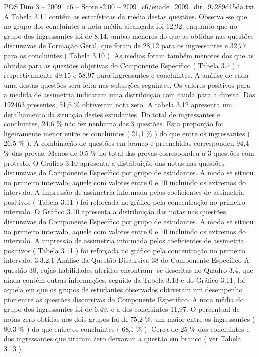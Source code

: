 \begin{textsample}{POS Dim 3 – 2009\_c6 – Score -2.00 – 2009\_c6/enade\_2009\_dir\_97289d15da.txt}
A Tabela 3.11 contém as estatísticas da média destas questões.
Observa -se que no grupo dos concluintes a nota média alcançada foi 12,92, enquanto que no grupo dos ingressantes foi de 8,14, ambas menores do que as obtidas nas questões discursivas de Formação Geral, que foram de 28,12 para os ingressantes e 32,77 para os concluintes ( Tabela 3.10 ).
As médias foram também menores dos que as obtidas para as questões objetivas do Componente Específico ( Tabela 3.7 ) : respectivamente 49,15 e 58,97 para ingressantes e concluintes.
A análise de cada uma destas questões será feita nas subseções seguintes.
Os valores positivos para a medida de assimetria indicaram uma distribuição com cauda para a direita.
Dos 192463 presentes, 51,6 \% obtiveram nota zero.
A tabela 3.12 apresenta um detalhamento da situação destes estudantes.
Do total de ingressantes e concluintes, 24,6 \% não fez nenhuma das 3 questões.
Esta proporção foi ligeiramente menor entre os concluintes ( 21,1 \% ) do que entre os ingressantes ( 26,5 \% ).
A combinação de questões em branco e preenchidas correspondeu 94,4 \% das provas.
Menos de 0,5 \% no total das provas correspondeu a 3 questões com protesto.
O Gráfico 3.10 apresenta a distribuição das notas nas questões discursivas do Componente Específico por grupo de estudantes.
A moda se situou no primeiro intervalo, aquele com valores entre 0 e 10 incluindo os extremos do intervalo.
A impressão de assimetria informada pelos coeficientes de assimetria positivos ( Tabela 3.11 ) foi reforçada no gráfico pela concentração no primeiro intervalo.
O Gráfico 3.10 apresenta a distribuição das notas nas questões discursivas do Componente Específico por grupo de estudantes.
A moda se situou no primeiro intervalo, aquele com valores entre 0 e 10 incluindo os extremos do intervalo.
A impressão de assimetria informada pelos coeficientes de assimetria positivos ( Tabela 3.11 ) foi reforçada no gráfico pela concentração no primeiro intervalo. 3.3.2.1 Análise da Questão Discursiva 38 do Componente Específico A questão 38, cujas habilidades aferidas encontram -se descritas no Quadro 3.4, que ainda contém outras informações, seguido da Tabela 3.13 e do Gráfico 3.11, foi aquela em que os grupos de estudantes observados obtiveram um desempenho pior entre as questões discursivas do Componente Específico.
A nota média do grupo dos ingressantes foi de 6,49, e a dos concluintes 11,97.
O percentual de notas zero obtidas nos dois grupos foi de 75,2 \%, um maior entre os ingressantes ( 80,3 \% ) do que entre os concluintes ( 68,1 \% ).
Cerca de 25 \% dos concluintes e dos ingressantes que tiraram zero deixaram a questão em branco ( ver Tabela 3.13 ).

\end{textsample}
